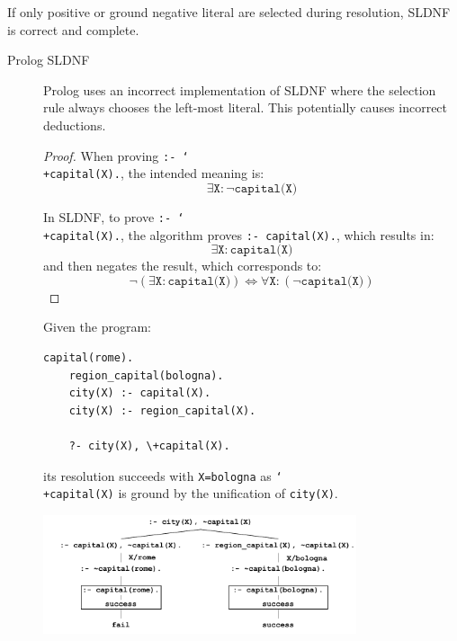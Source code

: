 \begin{description}
        \begin{theorem}
            If only positive or ground negative literal are selected during resolution, SLDNF is correct and complete.
        \end{theorem}

        \begin{description}
            \item[Prolog SLDNF] 
                Prolog uses an incorrect implementation of SLDNF where the selection rule always chooses the left-most literal.
                This potentially causes incorrect deductions.

                \begin{proof}
                    When proving \texttt{:- \char`\\+capital(X).}, the intended meaning is:
                    \[ \exists \texttt{X}: \lnot \texttt{capital(X)}  \]

                    In SLDNF, to prove \texttt{:- \char`\\+capital(X).}, the algorithm proves \texttt{:- capital(X).}, which results in:
                    \[ \exists \texttt{X}: \texttt{capital(X)}  \]
                    and then negates the result, which corresponds to:
                    \[ \lnot (\exists \texttt{X}: \texttt{capital(X)}) \iff \forall \texttt{X}: (\lnot \texttt{capital(X)}) \]

                \end{proof}

                \begin{example}
                    Given the program:
                    \begin{lstlisting}[language={}, mathescape=true]
    capital(rome).
    region_capital(bologna).
    city(X) :- capital(X).
    city(X) :- region_capital(X).

    ?- city(X), \+capital(X).
                    \end{lstlisting}
                    its resolution succeeds with \texttt{X=bologna} as \texttt{\char`\\+capital(X)} is ground by the unification of \texttt{city(X)}.
                    \begin{center}
                        \includegraphics[width=0.75\textwidth]{img/_sldnf_correct_example.pdf}
                    \end{center}
                \end{example}


\end{description}
\end{description}
